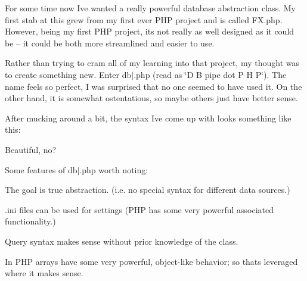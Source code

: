 For some time now I\textquotesingle{}ve wanted a really powerful database abstraction class. My first stab at this grew from my first ever P\+HP project and is called F\+X.\+php. However, being my first P\+HP project, it\textquotesingle{}s not really as well designed as it could be -- it could be both more streamlined and easier to use.

Rather than trying to cram all of my learning into that project, my thought was to create something new. Enter db$\vert$.php (read as \char`\"{}\+D B pipe dot P H P\char`\"{}). The name feels so perfect, I was surprised that no one seemed to have used it. On the other hand, it is somewhat ostentatious, so maybe others just have better sense.

After mucking around a bit, the syntax I\textquotesingle{}ve come up with looks something like this\+: 
\begin{DoxyCode}{0}
\DoxyCodeLine{\textcolor{comment}{// A couple notes:}}
\DoxyCodeLine{\textcolor{comment}{// -\/ The FMX namespace indicates a FileMaker XML datasource}}
\DoxyCodeLine{\textcolor{comment}{// -\/ The .ini file would contain the settings for your data sources}}
\end{DoxyCode}
 Beautiful, no?

Some features of db$\vert$.php worth noting\+:


\begin{DoxyItemize}
\item The goal is true abstraction. (i.\+e. no special syntax for different data sources.)
\item {\ttfamily .ini} files can be used for settings (P\+HP has some very powerful associated functionality.)
\item Query syntax makes sense without prior knowledge of the class.
\item In P\+HP arrays have some very powerful, object-\/like behavior; so that\textquotesingle{}s leveraged where it makes sense.
\end{DoxyItemize}


